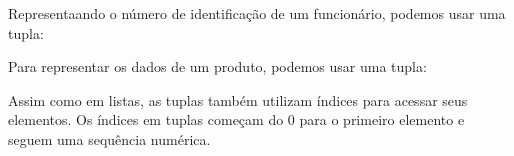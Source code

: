 \documentclass[letterpaper,10pt,english]{jupyterBook}
\begin{document}
\begin{sphinxVerbatim}[commandchars=\\\{\}]
   
\end{sphinxVerbatim}

\sphinxAtStartPar
Representaando o número de identificação de um funcionário, podemos usar uma tupla:

\begin{sphinxVerbatim}[commandchars=\\\{\}]
   
\end{sphinxVerbatim}

\sphinxAtStartPar
Para representar os dados de um produto, podemos usar uma tupla:

\begin{sphinxVerbatim}[commandchars=\\\{\}]
    
\end{sphinxVerbatim}

\sphinxAtStartPar
{}

\sphinxAtStartPar
Assim como em listas, as tuplas também utilizam índices para acessar seus elementos. Os índices em tuplas começam do 0 para o primeiro elemento e seguem uma sequência numérica.

\sphinxAtStartPar
{}
\end{document}
